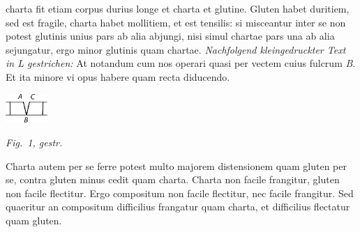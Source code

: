 charta\protect{} fit etiam corpus
durius\protect{} longe et charta et glutine.
Gluten habet duritiem,\protect{}
sed est fragile,\protect{}
charta habet mollitiem,\protect{}
et est tensilis:\protect{}
si misceantur inter se non potest glutinis unius pars ab alia abjungi,
nisi simul chartae pars una ab alia sejungatur,
ergo minor
glutinis quam chartae.
\pend%
\vspace{0.5em}%
\pstart%
\noindent%
\lbrack\textit{Nachfolgend kleingedruckter Text in L gestrichen:}\rbrack%
\pend%
\footnotesize%
\vspace{0.5em}%
\pstart%
\noindent%
At notandum cum
nos operari quasi per vectem\protect{}
cuius fulcrum\protect{} \textit{B}.
Et ita minore vi\protect{} opus habere quam recta diducendo.
\pend%
%
  \vspace{1.5em}%
  \centerline{\includegraphics[width=0.12\textwidth]{gesamttex/edit_VIII,3/images/LH_35_09_15_020r_d.pdf}}%
  \vspace*{0.5em}
  \centerline{{\normalsize{\lbrack\textit{Fig.~1, gestr.}\rbrack}}}%
  \vspace{1.5em}%
%
\normalsize%
\pstart%
\noindent%
Charta autem per se ferre potest multo majorem distensionem\protect{}
quam gluten per se,
contra gluten minus cedit quam charta.
Charta non facile frangitur, gluten non facile flectitur.
Ergo compositum non facile flectitur, nec facile frangitur.
Sed quaeritur
an compositum\protect{}
difficilius frangatur quam charta,\protect{}
et difficilius flectatur quam gluten.\protect{}%
%
\pend%
%
%
